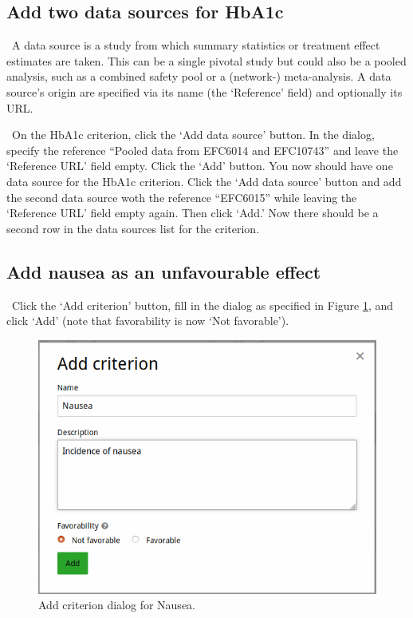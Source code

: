 \documentclass[00_mcda_tutorial.tex]{subfiles}
\begin{document}
\subsection*{Add two data sources for HbA1c}
\noindent \faGraduationCap \, A data source is a study from which summary statistics or treatment effect estimates are taken. This can be a single pivotal study but could also be a pooled analysis, such as a combined safety pool or a (network-) meta-analysis. A data source’s origin are specified via its name (the ‘Reference’ field) and optionally its URL.
\newline

\noindent \leftpointright \, On the HbA1c criterion, click the ‘Add data source’ button. In the dialog, specify the reference “Pooled data from EFC6014 and EFC10743” and leave the ‘Reference URL’ field empty. Click the ‘Add’ button. You now should have one data source for the HbA1c criterion. Click the ‘Add data source’ button and add the second data source woth the reference “EFC6015” while leaving the ‘Reference URL’ field empty again. Then click ‘Add.’ Now there should be a second row in the data sources list for the criterion.

\subsection*{Add nausea as an unfavourable effect}
\noindent \leftpointright \, Click the ‘Add criterion’ button, fill in the dialog as specified in Figure \ref{fig:crit2}, and click ‘Add’ (note that favorability is now ‘Not favorable’).
\newline

\begin{figure}[!h]
    \centering
	\includegraphics[width=\textwidth]{fig/addNausea.png}
    \caption{Add criterion dialog for Nausea.}
	\label{fig:crit2}
\end{figure}
\end{document}
